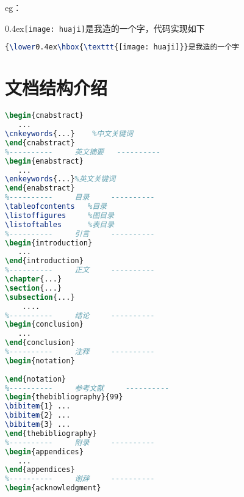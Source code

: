 \documentclass{imutthesis}
\begin{document}
eg：{\lower0.4ex\hbox{\texttt{[image: huaji]}}是我造的一个字，代码实现如下

\begin{lstlisting}[language=TeX]
{\lower0.4ex\hbox{\texttt{[image: huaji]}}是我造的一个字
\end{lstlisting} 
\chapter{文档结构介绍}
\begin{lstlisting}[language=TeX]
%----------     中文摘要     ----------
\begin{cnabstract}   
   ...
\cnkeywords{...}    %中文关键词	
\end{cnabstract}
%----------     英文摘要   ----------
\begin{enabstract}    
   ...		
\enkeywords{...}%英文关键词	
\end{enabstract}
%----------     目录     ----------
\tableofcontents   %目录
\listoffigures     %图目录
\listoftables      %表目录
%----------     引言     ----------
\begin{introduction}  
   ...
\end{introduction}
%----------     正文     ----------
\chapter{...}
\section{...}
\subsection{...}
    ....
%----------     结论     ----------
\begin{conclusion}
   ...	
\end{conclusion}
%----------     注释     ----------
\begin{notation}
	
\end{notation}    
%----------     参考文献     ----------
\begin{thebibliography}{99}
\bibitem{1} ...
\bibitem{2} ...
\bibitem{3} ...
\end{thebibliography}
%----------     附录     ----------
\begin{appendices}
   ...	
\end{appendices}
%----------     谢辞     ----------
\begin{acknowledgment}
	

\end{lstlisting}}
\end{document}
